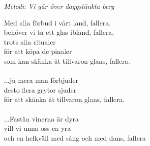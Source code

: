 {\footnotesize\textit{Melodi: Vi går över daggstänkta berg}}\par
\vspace{10pt}
Med alla förbud i vårt land, fallera,\\
behöver vi ta ett glas ibland, fallera,\\
trots alla ritualer\\
för att köpa de pinaler\\
som kan skänka åt tillvaron glans, fallera.\\
\\
...ju mera man förbjuder\\
desto flera grytor sjuder\\
för att skänka åt tillvaron glans, fallera.\\
\\
...Fastän vinerna är dyra\\
vill vi unna oss en yra\\
och en helkväll med sång och med dans, fallera

